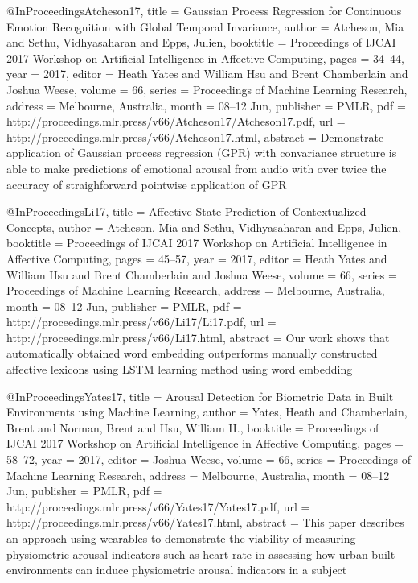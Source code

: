 @InProceedings{Atcheson17,
  title = {Gaussian Process Regression for Continuous Emotion Recognition with Global Temporal Invariance},
  author = {Atcheson, Mia and Sethu, Vidhyasaharan and Epps, Julien},
  booktitle = {Proceedings of IJCAI 2017 Workshop on Artificial Intelligence in Affective Computing},
  pages = 	 {34--44},
  year = 	 {2017},
  editor =    {Heath Yates and William Hsu and Brent Chamberlain and Joshua Weese},
  volume = 	 {66},
  series = 	 {Proceedings of Machine Learning Research},
  address =  {Melbourne, Australia},
  month = 	 {08--12 Jun},
  publisher = {PMLR},
  pdf = 	 {http://proceedings.mlr.press/v66/Atcheson17/Atcheson17.pdf},
  url = 	 {http://proceedings.mlr.press/v66/Atcheson17.html},
  abstract = {Demonstrate application of Gaussian process regression (GPR) with convariance structure is able to make predictions of emotional arousal from audio with over twice the accuracy of straighforward pointwise application of GPR}
}

@InProceedings{Li17,
  title = {Affective State Prediction of Contextualized Concepts},
  author = {Atcheson, Mia and Sethu, Vidhyasaharan and Epps, Julien},
  booktitle = {Proceedings of IJCAI 2017 Workshop on Artificial Intelligence in Affective Computing},
  pages = 	 {45--57},
  year = 	 {2017},
  editor =    {Heath Yates and William Hsu and Brent Chamberlain and Joshua Weese},
  volume = 	 {66},
  series = 	 {Proceedings of Machine Learning Research},
  address =  {Melbourne, Australia},
  month = 	 {08--12 Jun},
  publisher = {PMLR},
  pdf = 	 {http://proceedings.mlr.press/v66/Li17/Li17.pdf},
  url = 	 {http://proceedings.mlr.press/v66/Li17.html},
  abstract = {Our work shows that automatically obtained word embedding outperforms manually constructed affective lexicons using LSTM learning method using word embedding}
}

@InProceedings{Yates17,
  title = {Arousal Detection for Biometric Data in Built Environments using Machine Learning},
  author = {Yates, Heath and Chamberlain, Brent and Norman, Brent and Hsu, William H.},
  booktitle = {Proceedings of IJCAI 2017 Workshop on Artificial Intelligence in Affective Computing},
  pages = 	 {58--72},
  year = 	 {2017},
  editor =    {Joshua Weese},
  volume = 	 {66},
  series = 	 {Proceedings of Machine Learning Research},
  address =  {Melbourne, Australia},
  month = 	 {08--12 Jun},
  publisher = {PMLR},
  pdf = 	 {http://proceedings.mlr.press/v66/Yates17/Yates17.pdf},
  url = 	 {http://proceedings.mlr.press/v66/Yates17.html},
  abstract = {This paper describes an approach using wearables to demonstrate the viability of measuring physiometric arousal indicators such as heart rate in assessing how urban built environments can induce physiometric arousal indicators in a subject}
}



